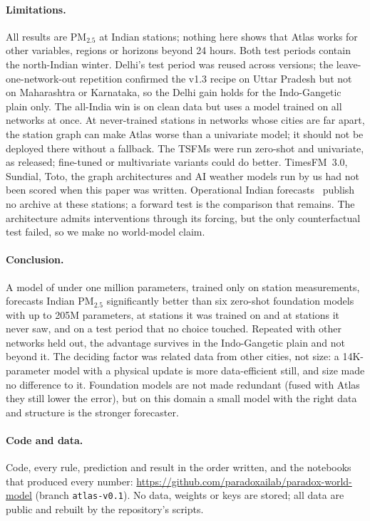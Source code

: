 \documentclass{article}
\newif\ifpreprint
\newcommand{\pmtf}{PM$_{2.5}$}
\begin{document}
\paragraph{Limitations.} All results are \pmtf{} at Indian stations; nothing here shows that Atlas works for other
variables, regions or horizons beyond 24 hours. Both test periods contain the north-Indian winter. Delhi's test period
was reused across versions; the leave-one-network-out repetition confirmed the v1.3 recipe on Uttar Pradesh but not on
Maharashtra or Karnataka, so the Delhi gain holds for the Indo-Gangetic plain only. The all-India win is on clean data
but uses a model trained on all networks at once. At never-trained stations in networks whose cities are far apart,
the station graph can make Atlas worse than a univariate model; it should not be deployed there without a fallback.
The TSFMs were run zero-shot and univariate, as released; fine-tuned or multivariate variants could do better.
TimesFM~3.0, Sundial, Toto, the graph architectures and AI weather models run by us had not been scored when this
paper was written. Operational Indian forecasts~\citep{yadav2025aqews} publish no archive at these stations; a forward
test is the comparison that remains. The architecture admits interventions through its forcing, but the only
counterfactual test failed, so we make no world-model claim.

\paragraph{Conclusion.} A model of under one million parameters, trained only on station measurements, forecasts
Indian \pmtf{} significantly better than six zero-shot foundation models with up to 205M parameters, at stations it was
trained on and at stations it never saw, and on a test period that no choice touched. Repeated with other networks held out, the advantage survives in the
Indo-Gangetic plain and not beyond it. The deciding factor was related
data from other cities, not size: a 14K-parameter model with a physical update is more data-efficient still, and
size made no difference to it. Foundation models are not made redundant (fused with Atlas they still lower the
error), but on this domain a small model with the right data and structure is the stronger forecaster.

\ifpreprint
\paragraph{Code and data.} Code, every rule, prediction and result in the order written, and the notebooks that produced
every number: \url{https://github.com/paradoxailab/paradox-world-model} (branch \texttt{atlas-v0.1}). No data, weights
or keys are stored; all data are public and rebuilt by the repository's scripts.
\else
\end{document}
